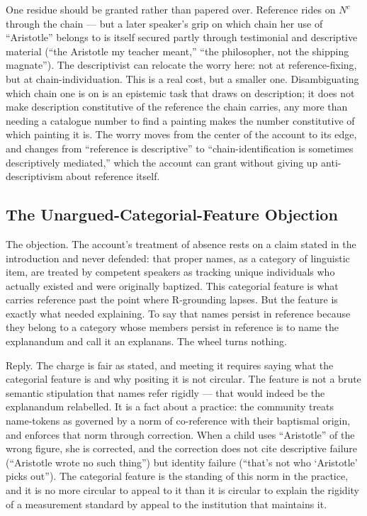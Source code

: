 \documentclass[12pt,a4paper]{article}
\begin{document}
One residue should be granted rather than papered over. Reference rides on \(N^c\) through the chain --- but a later speaker's grip on which chain her use of ``Aristotle'' belongs to is itself secured partly through testimonial and descriptive material (``the Aristotle my teacher meant,'' ``the philosopher, not the shipping magnate''). The descriptivist can relocate the worry here: not at reference-fixing, but at chain-individuation. This is a real cost, but a smaller one. Disambiguating which chain one is on is an epistemic task that draws on description; it does not make description constitutive of the reference the chain carries, any more than needing a catalogue number to find a painting makes the number constitutive of which painting it is. The worry moves from the center of the account to its edge, and changes from ``reference is descriptive'' to ``chain-identification is sometimes descriptively mediated,'' which the account can grant without giving up anti-descriptivism about reference itself.

\subsection{The Unargued-Categorial-Feature Objection}\label{the-unargued-categorial-feature-objection}

The objection. The account's treatment of absence rests on a claim stated in the introduction and never defended: that proper names, as a category of linguistic item, are treated by competent speakers as tracking unique individuals who actually existed and were originally baptized. This categorial feature is what carries reference past the point where R-grounding lapses. But the feature is exactly what needed explaining. To say that names persist in reference because they belong to a category whose members persist in reference is to name the explanandum and call it an explanans. The wheel turns nothing.

Reply. The charge is fair as stated, and meeting it requires saying what the categorial feature is and why positing it is not circular. The feature is not a brute semantic stipulation that names refer rigidly --- that would indeed be the explanandum relabelled. It is a fact about a practice: the community treats name-tokens as governed by a norm of co-reference with their baptismal origin, and enforces that norm through correction. When a child uses ``Aristotle'' of the wrong figure, she is corrected, and the correction does not cite descriptive failure (``Aristotle wrote no such thing'') but identity failure (``that's not who `Aristotle' picks out''). The categorial feature is the standing of this norm in the practice, and it is no more circular to appeal to it than it is circular to explain the rigidity of a measurement standard by appeal to the institution that maintains it.
\end{document}
